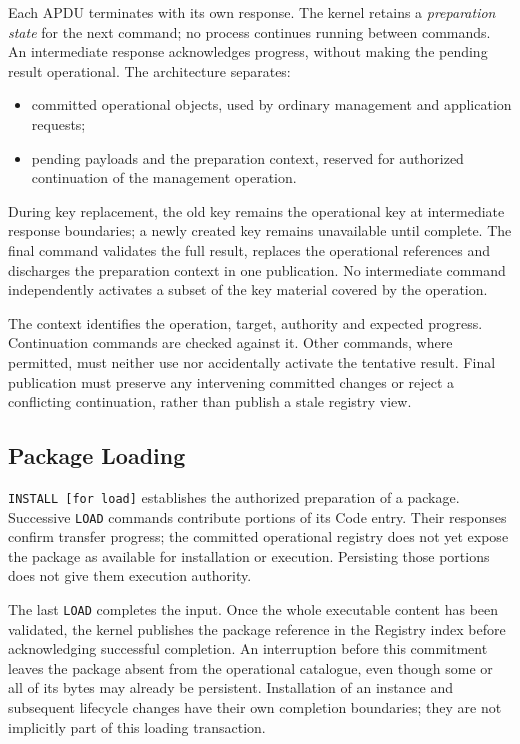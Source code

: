 Each APDU terminates with its own response. The kernel retains a
\emph{preparation state} for the next command; no process continues running
between commands. An intermediate response acknowledges progress, without
making the pending result operational. The architecture separates:
\begin{itemize}
\item committed operational objects, used by ordinary management and
  application requests;
\item pending payloads and the preparation context, reserved for authorized
  continuation of the management operation.
\end{itemize}

During key replacement, the old key remains the operational key at
intermediate response boundaries; a newly created key remains unavailable
until complete. The final command validates the full result, replaces the
operational references and discharges the preparation context in one
publication. No intermediate command independently activates a subset of the
key material covered by the operation.

The context identifies the operation, target, authority and expected progress.
Continuation commands are checked against it. Other commands, where permitted,
must neither use nor accidentally activate the tentative result. Final
publication must preserve any intervening committed changes or reject a
conflicting continuation, rather than publish a stale registry view.

\subsection{Package Loading}
\label{subsec:persistence-dynamic-package-loading}

\texttt{INSTALL [for load]} establishes the authorized preparation of a
package. Successive \texttt{LOAD} commands contribute portions of its Code
entry. Their responses confirm transfer progress; the committed operational
registry does not yet expose the package as available for installation or
execution. Persisting those portions does not give them execution authority.

The last \texttt{LOAD} completes the input. Once the whole executable content
has been validated, the kernel publishes the package reference in the Registry
index before acknowledging successful completion. An interruption before this
commitment leaves the package absent from the operational catalogue, even
though some or all of its bytes may already be persistent. Installation of an
instance and subsequent lifecycle changes have their own completion
boundaries; they are not implicitly part of this loading transaction.

